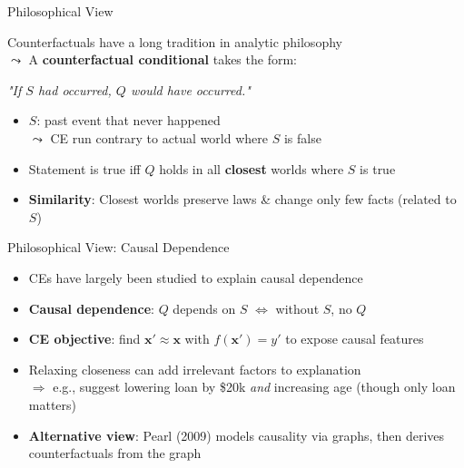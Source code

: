 \documentclass[11pt,compress,t,notes=noshow, aspectratio=169, xcolor=table, usenames,dvipsnames]{beamer}
\begin{document}
\begin{frame}{Philosophical View }

Counterfactuals have a long tradition in analytic philosophy\\
$\leadsto$ A \textbf{counterfactual conditional} takes the form:

\begin{center}
  \emph{"If $S$ had occurred, $Q$ would have occurred."}
\end{center}

  \begin{itemize}%
    \item $S$: past event that never happened\\
    $\leadsto$ CE run contrary to actual world where $S$ is false
    \item Statement is true iff $Q$ holds in all \textbf{closest} worlds where $S$ is true
    \item \textbf{Similarity}: Closest worlds preserve laws \& change only few facts (related to $S$)
  \end{itemize}
\end{frame}

\begin{frame}{Philosophical View: Causal Dependence}
  \begin{itemize}%
    \item CEs have largely been studied to explain causal dependence
    \item \textbf{Causal dependence}: $Q$ depends on $S$   $\Leftrightarrow$ without $S$, no $Q$
    \item \textbf{CE objective}: find $\mathbf{x}' \!\approx\! \mathbf{x}$ with $f(\mathbf{x}')=y'$ to expose causal features
    \item Relaxing closeness can add irrelevant factors to explanation\\
$\Rightarrow$ e.g., suggest lowering loan by \$20k \emph{and} increasing age (though only loan matters)
    \item \textbf{Alternative view}: Pearl (2009) models causality via graphs, then derives counterfactuals from the graph
  \end{itemize}
\end{frame}
\end{document}
